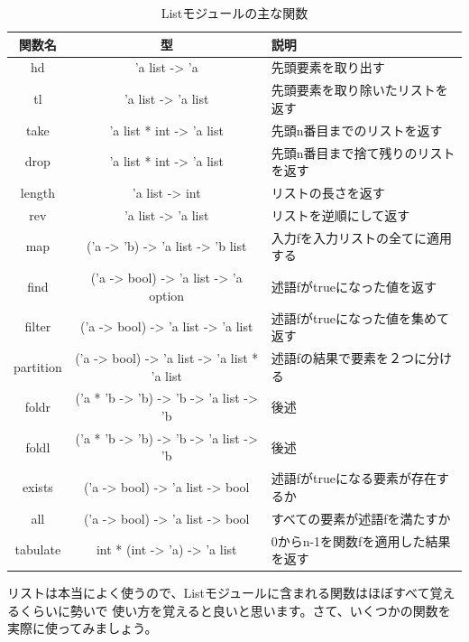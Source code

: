 \documentclass[11pt,a4paper]{article}
\begin{document}
\begin{table}[htbp]
  \begin{tabular}{|c|c|l|}
\hline
関数名 & 型 & 説明 \\ \hline \hline
hd & 'a list -> 'a                                         & 先頭要素を取り出す\\ \hline
tl & 'a list -> 'a list                                    & 先頭要素を取り除いたリストを返す\\ \hline
take & 'a list * int -> 'a list                            & 先頭n番目までのリストを返す\\ \hline
drop & 'a list * int -> 'a list                            & 先頭n番目まで捨て残りのリストを返す\\ \hline
length & 'a list -> int                                    & リストの長さを返す\\ \hline
rev & 'a list -> 'a list                                   & リストを逆順にして返す\\ \hline
map & ('a -> 'b) -> 'a list -> 'b list                     & 入力fを入力リストの全てに適用する\\ \hline
find & ('a -> bool) -> 'a list -> 'a option                & 述語fがtrueになった値を返す\\ \hline
filter & ('a -> bool) -> 'a list -> 'a list                & 述語fがtrueになった値を集めて返す\\ \hline
partition & ('a -> bool) -> 'a list -> 'a list * 'a list   & 述語fの結果で要素を２つに分ける\\ \hline
foldr & ('a * 'b -> 'b) -> 'b -> 'a list -> 'b             & 後述\\ \hline
foldl & ('a * 'b -> 'b) -> 'b -> 'a list -> 'b             & 後述\\ \hline
exists & ('a -> bool) -> 'a list -> bool                   & 述語fがtrueになる要素が存在するか\\ \hline
all & ('a -> bool) -> 'a list -> bool                      & すべての要素が述語fを満たすか\\ \hline
tabulate & int * (int -> 'a) -> 'a list                    & 0からn-1を関数fを適用した結果を返す\\ \hline
  \end{tabular}
  \caption{Listモジュールの主な関数}
  \label{fig:list-table}
\end{table}

リストは本当によく使うので、Listモジュールに含まれる関数はほぼすべて覚えるくらいに勢いで
使い方を覚えると良いと思います。さて、いくつかの関数を実際に使ってみましょう。
\end{document}
